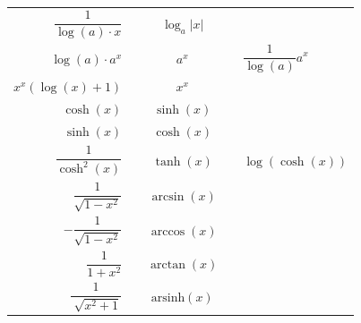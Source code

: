 \begin{multicols*}{3}
\begin{center}
\begin{tabular} {r c c c l}
            \midrule
            $\dfrac{1}{\log(a) \cdot x}$          & \hspace*{-20pt} & $\log_a|x|$        & \hspace*{-20pt} &                              \\
            $\log(a) \cdot a^x$                   & \hspace*{-20pt} & $a^x$              & \hspace*{-20pt} & $\dfrac{1}{\log(a)} a^x$     \\
            $x^x (\log(x)+1)$                     & \hspace*{-20pt} & $x^x$              & \hspace*{-20pt} &                              \\
            \midrule
            $\cosh(x)$                            & \hspace*{-20pt} & $\sinh(x)$         & \hspace*{-20pt} &                              \\
            $\sinh(x)$                            & \hspace*{-20pt} & $\cosh(x)$         & \hspace*{-20pt} &                              \\
            $\dfrac{1}{\cosh^2(x)}$               & \hspace*{-20pt} & $\tanh(x)$         & \hspace*{-20pt} & $\log(\cosh(x))$             \\
            \midrule
            $\dfrac{1}{\sqrt{1 - x^2}}$           & \hspace*{-20pt} & $\arcsin(x)$       & \hspace*{-20pt} &                              \\
            $- \dfrac{1}{\sqrt{1 - x^2}}$         & \hspace*{-20pt} & $\arccos(x)$       & \hspace*{-20pt} &                              \\
            $\dfrac{1}{1 + x^2}$                  & \hspace*{-20pt} & $\arctan(x)$       & \hspace*{-20pt} &                              \\
            \midrule
            $\dfrac{1}{\sqrt[]{x^2 + 1}}$         & \hspace*{-20pt} & $\text{arsinh}(x)$ & \hspace*{-20pt} &                              \\

\end{tabular}
\end{center}
\end{multicols*}

